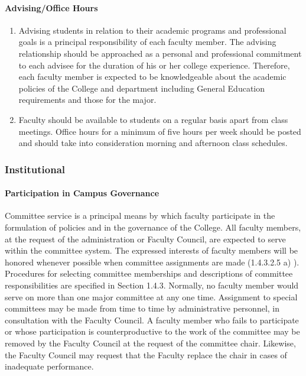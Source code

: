 \documentclass[letterpaper, 11pt]{article}
\begin{document}
			\paragraph{Advising/Office Hours}
				\begin{enumerate}[label=\alph*)]
					\item{Advising students in relation to their academic programs and professional goals is a principal responsibility of each faculty member.  The advising relationship should be approached as a personal and professional commitment to each advisee for the duration of his or her college experience.  Therefore, each faculty member is expected to be knowledgeable about the academic policies of the College and department including General Education requirements and those for the major.}
					\item{Faculty should be available to students on a regular basis apart from class meetings. Office hours for a minimum of five hours per week should be posted and should take into consideration morning and afternoon class schedules.}
				\end{enumerate}
		\subsubsection{Institutional}
			\paragraph{Participation in Campus Governance}
				\label{par:ParticipationInCampusGovernance}
				Committee service is a principal means by which faculty participate in the formulation of policies and in the governance of the College.  All faculty members, at the request of the administration or Faculty Council, are expected to serve within the committee system.  The expressed interests of faculty members will be honored whenever possible when committee assignments are made (1.4.3.2.5 a) ).  Procedures for selecting committee memberships and descriptions of committee responsibilities are specified in Section 1.4.3.  Normally, no faculty member would serve on more than one major committee at any one time.  Assignment to special committees may be made from time to time by administrative personnel, in consultation with the Faculty Council.  A faculty member who fails to participate or whose participation is counterproductive to the work of the committee may be removed by the Faculty Council at the request of the committee chair.  Likewise, the Faculty Council may request that the Faculty replace the chair in cases of inadequate performance.
\end{document}
